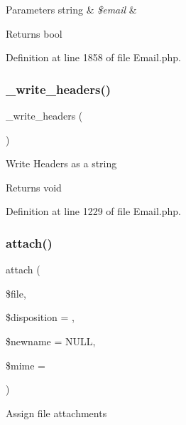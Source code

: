 \begin{DoxyParams}[1]{Parameters}
string & {\em \$email} & \\
\hline
\end{DoxyParams}
\begin{DoxyReturn}{Returns}
bool 
\end{DoxyReturn}


Definition at line 1858 of file Email.\+php.

\mbox{\label{class_c_i___email_a6bde7269215bc1093811ae098bb034bf}} 
\subsubsection{\texorpdfstring{\_write\_headers()}{\_write\_headers()}}
{\footnotesize\ttfamily \+\_\+write\+\_\+headers (\begin{DoxyParamCaption}{ }\end{DoxyParamCaption})\hspace{0.3cm}{\ttfamily [protected]}}

Write Headers as a string

\begin{DoxyReturn}{Returns}
void 
\end{DoxyReturn}


Definition at line 1229 of file Email.\+php.

\mbox{\label{class_c_i___email_adb1bcf392d6cf38e3f94675a21cab563}} 
\subsubsection{\texorpdfstring{attach()}{attach()}}
{\footnotesize\ttfamily attach (\begin{DoxyParamCaption}\item[{}]{\$file,  }\item[{}]{\$disposition = {\ttfamily \textquotesingle{}\textquotesingle{}},  }\item[{}]{\$newname = {\ttfamily NULL},  }\item[{}]{\$mime = {\ttfamily \textquotesingle{}\textquotesingle{}} }\end{DoxyParamCaption})}

Assign file attachments


